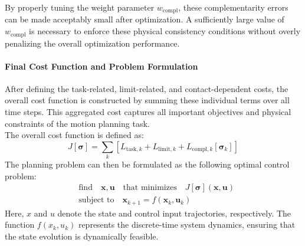 \documentclass[main.tex]{subfiles}
\begin{document}
By properly tuning the weight parameter $w_{\text{compl}}$, these complementarity errors can be made acceptably small after optimization. A sufficiently large value of $w_{\text{compl}}$ is necessary to enforce these physical consistency conditions without overly penalizing the overall optimization performance.
\paragraph{Final Cost Function and Problem Formulation}
After defining the task-related, limit-related, and contact-dependent costs, the overall cost function is constructed by summing these individual terms over all time steps. This aggregated cost captures all important objectives and physical constraints of the motion planning task.
\\
The overall cost function is defined as:
\begin{equation}
J[\boldsymbol{\sigma}] = \sum_k \left[ L_{\text{task},k} + L_{\text{limit},k} + L_{\text{compl},k}[\boldsymbol{\sigma}_k] \right]
\end{equation}
The planning problem can then be formulated as the following optimal control problem:
\begin{equation}
\begin{aligned}
& \text{find} \quad \mathbf{x}, \mathbf{u} \quad \text{that minimizes} \quad J[\boldsymbol{\sigma}](\mathbf{x},\mathbf{u}) \\
& \text{subject to} \quad \mathbf{x}_{k+1} = f(\mathbf{x}_k, \mathbf{u}_k)
\end{aligned}
\end{equation}
Here, $x$ and $u$ denote the state and control input trajectories, respectively. The function $f(x_k, u_k)$ represents the discrete-time system dynamics, ensuring that the state evolution is dynamically feasible.
\begin{comment}
This problem is formulated using a \textit{single shooting} approach, where the control inputs are directly optimized and the states are obtained by integrating the system dynamics forward in time. 
Due to the nonlinearities in the cost terms (especially those involving contact forces and constraints) and the system dynamics, the resulting optimization is generally a \textit{nonlinear programming problem} (NLP). However, in certain cases where the dynamics and cost functions are affine and the constraints are quadratic, the problem structure could be approximated as a \textit{quadratic programming} (QP) problem to enable faster computation.
Overall, the optimization simultaneously enforces task tracking, physical feasibility, and complementarity conditions related to contact interactions throughout the planned motion.
\end{comment}
\end{document}
